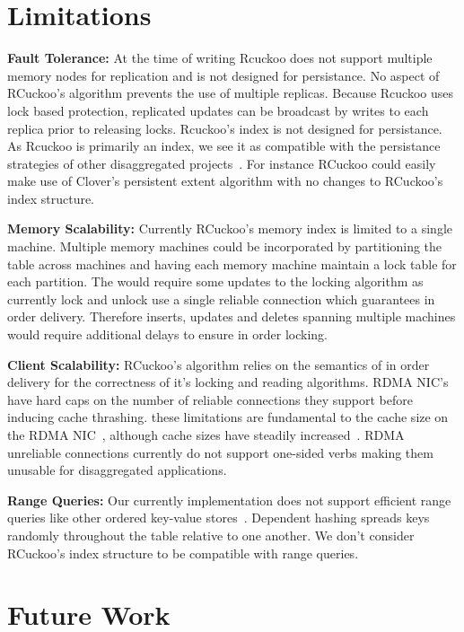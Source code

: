 \section{Limitations}
\label{sec:limations}

\textbf{Fault Tolerance:} At the time of
writing Rcuckoo does not support multiple memory nodes for
replication and is not designed for persistance. No aspect
of RCuckoo's algorithm prevents the use of multiple
replicas. Because Rcuckoo uses lock based protection,
replicated updates can be broadcast by writes to each
replica prior to releasing locks. Rcuckoo's index is not
designed for persistance. As Rcuckoo is primarily an index,
we see it as compatible with the persistance strategies of
other disaggregated projects~\cite{clover}. For instance
RCuckoo could easily make use of Clover's persistent extent
algorithm with no changes to RCuckoo's index structure.

\textbf{Memory Scalability:} Currently RCuckoo's memory index
is limited to a single machine. Multiple memory machines
could be incorporated by partitioning the table across
machines and having each memory machine maintain a lock
table for each partition. The would require some updates to
the locking algorithm as currently lock and unlock use a
single reliable connection which guarantees in order
delivery. Therefore inserts, updates and deletes spanning
multiple machines would require additional delays to ensure
in order locking.

\textbf{Client Scalability:} RCuckoo's algorithm relies on
the semantics of in order delivery for the correctness of
it's locking and reading algorithms. RDMA NIC's have hard
caps on the number of reliable connections they support
before inducing cache thrashing. these limitations are
fundamental to the cache size on the RDMA
NIC~\cite{erpc,faast,one-rma}, although cache sizes have
steadily increased~\cite{storm}. RDMA unreliable connections
currently do not support one-sided verbs making them
unusable for disaggregated applications.

\textbf{Range Queries:} Our currently implementation does
not support efficient range queries like other ordered
key-value stores~\cite{sherman,rolex}. Dependent hashing
spreads keys randomly throughout the table relative to one
another. We don't consider RCuckoo's index structure to be
compatible with range queries.

\section{Future Work}
\label{sec:future}


